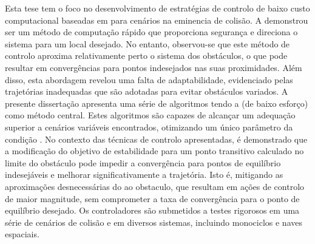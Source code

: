 
%


Esta tese tem o foco no desenvolvimento de estratégias de controlo de baixo custo computacional baseadas em  para cenários na eminencia de colisão. A  demonstrou ser um método de computação rápido que proporciona segurança e direciona o sistema para um local desejado. No entanto, observou-se que este método de controlo aproxima relativamente perto o sistema dos obstáculos, o que pode resultar em convergências para pontos indesejados nas suas proximidades. Além disso, esta abordagem revelou uma falta de adaptabilidade, evidenciado pelas trajetórias inadequadas que são adotadas para evitar obstáculos variados.
A presente dissertação apresenta uma série de algoritmos tendo a  (de baixo esforço) como método central. Estes algoritmos são capazes de alcançar um adequação superior a cenários variáveis encontrados, otimizando um único parâmetro da condição . No contexto das técnicas de controlo apresentadas, é demonstrado que a modificação do objetivo de estabilidade para um ponto transitivo calculado no limite do obstáculo pode impedir a convergência para pontos de equilíbrio indesejáveis e melhorar significativamente a trajetória. Isto é, mitigando as aproximações desnecessárias do  ao obstaculo, que resultam em ações de controlo de maior magnitude, sem comprometer a taxa de convergência para o ponto de equilíbrio desejado. 
Os controladores são submetidos a testes rigorosos em uma série de cenários de colisão e em diversos sistemas, incluindo monociclos e naves espaciais.





